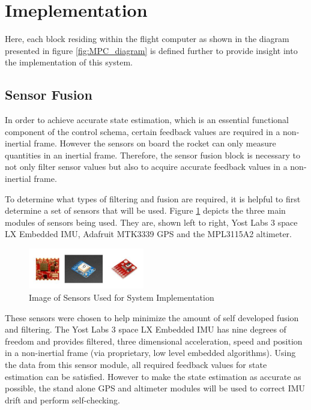 \documentclass[conference, letterpaper]{IEEEtran}
\begin{document}
\section{Imeplementation}

Here, each block residing within the flight computer as shown in
the diagram presented in figure \ref{fig:MPC_diagram} is
defined further to provide insight into the implementation of this
system.

\subsection{Sensor Fusion}

In order to achieve accurate state estimation, which is an essential functional
component of the control schema, certain feedback values are required in a
non-inertial frame. However the sensors on board the rocket can only measure
quantities in an inertial frame. Therefore, the sensor fusion block is necessary
to not only filter sensor values but also to acquire accurate feedback values in
a non-inertial frame.

To determine what types of filtering and fusion are required, it is helpful to
first determine a set of sensors that will be used. Figure \ref{fig:sensors}
depicts the three main modules of sensors being used. They are, shown left to right,
Yost Labs 3 space LX Embedded IMU, Adafruit MTK3339 GPS and the MPL3115A2 altimeter.

\begin{figure}[H]
\centering
\includegraphics[width=0.45\textwidth]{./sensors}
\caption{Image of Sensors Used for System Implementation}
\label{fig:sensors}
\end{figure}

These sensors were chosen to help minimize the amount of self developed fusion and
filtering. The Yost Labs 3 space LX Embedded IMU has nine degrees of freedom and
provides filtered, three dimensional acceleration, speed and position in a
non-inertial frame (via proprietary, low level embedded algorithms). Using the data
from this sensor module, all required feedback values for state estimation can be
satisfied. However to make the state estimation as accurate as possible, the
stand alone GPS and altimeter modules will be used to correct IMU drift and
perform self-checking.
\end{document}

